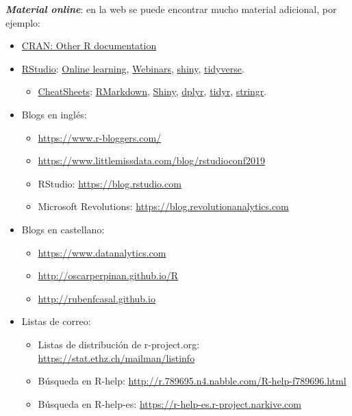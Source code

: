 \documentclass[
]{book}
\providecommand{\tightlist}{%
  \setlength{\itemsep}{0pt}\setlength{\parskip}{0pt}}
\theoremstyle{break}
\theoremstyle{nonumberplain}
\begin{document}
\textbf{\emph{Material online}}:
en la web se puede encontrar mucho material adicional, por ejemplo:

\begin{itemize}
\item
  \href{https://www.r-project.org/other-docs.html}{CRAN: Other R documentation}
\item
  \href{https://www.rstudio.com}{RStudio}:
  \href{https://www.rstudio.com/online-learning}{Online learning},
  \href{https://resources.rstudio.com/webinars}{Webinars},
  \href{http://shiny.rstudio.com}{shiny},
  \href{https://www.tidyverse.org/}{tidyverse}.

  \begin{itemize}
  \tightlist
  \item
    \href{https://resources.rstudio.com/rstudio-cheatsheets}{CheatSheets}:
    \href{https://resources.rstudio.com/rstudio-cheatsheets/rmarkdown-2-0-cheat-sheet}{RMarkdown},
    \href{https://resources.rstudio.com/rstudio-cheatsheets/shiny-cheat-sheet}{Shiny},
    \href{https://github.com/rstudio/cheatsheets/blob/master/data-transformation.pdf}{dplyr},
    \href{https://github.com/rstudio/cheatsheets/blob/master/data-import.pdf}{tidyr},
    \href{https://resources.rstudio.com/rstudio-cheatsheets/stringr-cheat-sheet}{stringr}.
  \end{itemize}
\item
  Blogs en inglés:

  \begin{itemize}
  \item
    \url{https://www.r-bloggers.com/}
  \item
    \url{https://www.littlemissdata.com/blog/rstudioconf2019}
  \item
    RStudio: \url{https://blog.rstudio.com}
  \item
    Microsoft Revolutions: \url{https://blog.revolutionanalytics.com}
  \end{itemize}
\item
  Blogs en castellano:

  \begin{itemize}
  \item
    \url{https://www.datanalytics.com}
  \item
    \url{http://oscarperpinan.github.io/R}
  \item
    \url{http://rubenfcasal.github.io}
  \end{itemize}
\item
  Listas de correo:

  \begin{itemize}
  \item
    Listas de distribución de r-project.org: \url{https://stat.ethz.ch/mailman/listinfo}
  \item
    Búsqueda en R-help: \url{http://r.789695.n4.nabble.com/R-help-f789696.html}
  \item
    Búsqueda en R-help-es: \url{https://r-help-es.r-project.narkive.com}


\end{itemize}
\end{itemize}
\end{document}
